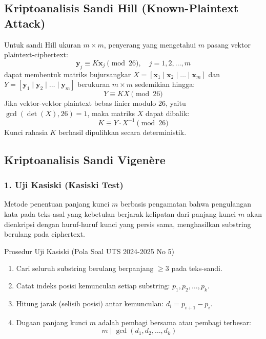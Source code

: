 \documentclass[11pt,a4paper]{article}
\begin{document}
\subsection{Kriptoanalisis Sandi Hill (Known-Plaintext Attack)}
Untuk sandi Hill ukuran $m \times m$, penyerang yang mengetahui $m$ pasang vektor plaintext-ciphertext:
\[
\mathbf{y}_j \equiv K \mathbf{x}_j \pmod{26}, \quad j = 1, 2, \dots, m
\]
dapat membentuk matriks bujursangkar $X = [\mathbf{x}_1 \mid \mathbf{x}_2 \mid \dots \mid \mathbf{x}_m]$ dan $Y = [\mathbf{y}_1 \mid \mathbf{y}_2 \mid \dots \mid \mathbf{y}_m]$ berukuran $m \times m$ sedemikian hingga:
\[
Y \equiv K X \pmod{26}
\]
Jika vektor-vektor plaintext bebas linier modulo 26, yaitu $\gcd(\det(X), 26) = 1$, maka matriks $X$ dapat dibalik:
\[
K \equiv Y \cdot X^{-1} \pmod{26}
\]
Kunci rahasia $K$ berhasil dipulihkan secara deterministik.

\subsection{Kriptoanalisis Sandi Vigen\`ere}

\subsubsection{1. Uji Kasiski (Kasiski Test)}
Metode penentuan panjang kunci $m$ berbasis pengamatan bahwa pengulangan kata pada teks-asal yang kebetulan berjarak kelipatan dari panjang kunci $m$ akan dienkripsi dengan huruf-huruf kunci yang persis sama, menghasilkan substring berulang pada ciphertext.
\begin{rumusbox}{Prosedur Uji Kasiski (Pola Soal UTS 2024-2025 No 5)}
\begin{enumerate}[leftmargin=*]
    \item Cari seluruh substring berulang berpanjang $\ge 3$ pada teks-sandi.
    \item Catat indeks posisi kemunculan setiap substring: $p_1, p_2, \dots, p_k$.
    \item Hitung jarak (selisih posisi) antar kemunculan: $d_i = p_{i+1} - p_i$.
    \item Dugaan panjang kunci $m$ adalah pembagi bersama atau pembagi terbesar:
    \[
    m \mid \gcd(d_1, d_2, \dots, d_k)
    \]
\end{enumerate}
\end{rumusbox}
\end{document}

